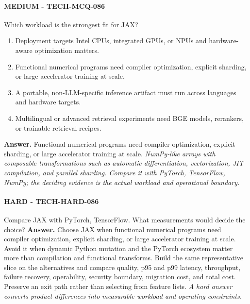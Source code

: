 \paragraph{MEDIUM - TECH-MCQ-086} Which workload is the strongest fit for JAX?
\begin{enumerate}[label=\Alph*.]
\item Deployment targets Intel CPUs, integrated GPUs, or NPUs and hardware-aware optimization matters.
\item Functional numerical programs need compiler optimization, explicit sharding, or large accelerator training at scale.
\item A portable, non-LLM-specific inference artifact must run across languages and hardware targets.
\item Multilingual or advanced retrieval experiments need BGE models, rerankers, or trainable retrieval recipes.
\end{enumerate}
\textbf{Answer.} Functional numerical programs need compiler optimization, explicit sharding, or large accelerator training at scale.
\textit{NumPy-like arrays with composable transformations such as automatic differentiation, vectorization, JIT compilation, and parallel sharding. Compare it with PyTorch, TensorFlow, NumPy; the deciding evidence is the actual workload and operational boundary.}
\paragraph{HARD - TECH-HARD-086} Compare JAX with PyTorch, TensorFlow. What measurements would decide the choice?
\textbf{Answer.} Choose JAX when functional numerical programs need compiler optimization, explicit sharding, or large accelerator training at scale. Avoid it when dynamic Python mutation and the PyTorch ecosystem matter more than compilation and functional transforms. Build the same representative slice on the alternatives and compare quality, p95 and p99 latency, throughput, failure recovery, operability, security boundary, migration cost, and total cost. Preserve an exit path rather than selecting from feature lists.
\textit{A hard answer converts product differences into measurable workload and operating constraints.}
